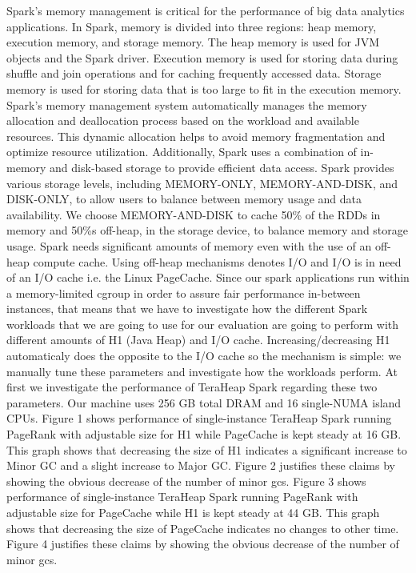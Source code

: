 \documentclass[twocolumn,10pt]{asme2e}
\begin{document}
Spark's memory management is critical for the performance of big data analytics applications. In Spark, memory is divided into three regions: heap memory, execution memory, and storage memory. The heap memory is used for JVM objects and the Spark driver. Execution memory is used for storing data during shuffle and join operations and for caching frequently accessed data. Storage memory is used for storing data that is too large to fit in the execution memory. Spark's memory management system automatically manages the memory allocation and deallocation process based on the workload and available resources. This dynamic allocation helps to avoid memory fragmentation and optimize resource utilization. Additionally, Spark uses a combination of in-memory and disk-based storage to provide efficient data access. Spark provides various storage levels, including MEMORY-ONLY, MEMORY-AND-DISK, and DISK-ONLY, to allow users to balance between memory usage and data availability. We choose MEMORY-AND-DISK to cache 50\% of the RDDs in memory and 50\%s off-heap, in the storage device, to balance memory and storage usage. Spark needs significant amounts of memory even with the use of an off-heap compute cache.
Using off-heap mechanisms denotes I/O and I/O is in need of an I/O cache i.e. the Linux PageCache. Since our spark applications run within a memory-limited cgroup in order to assure fair performance in-between instances, that means that we have to investigate how the different Spark workloads that we are going to use for our evaluation are going to perform with different amounts of H1 (Java Heap) and I/O cache. Increasing/decreasing H1 automaticaly does the opposite to the I/O cache so the mechanism is simple: we manually tune these parameters and investigate how the workloads perform. At first we investigate the performance of TeraHeap Spark regarding these two parameters. Our machine uses 256 GB total DRAM and 16 single-NUMA island CPUs.
\iffalse
Figure 1 shows performance of single-instance TeraHeap Spark running PageRank with adjustable size for H1 while PageCache is kept steady at 16 GB. This graph shows that decreasing the size of H1 indicates a significant increase to Minor GC and a slight increase to Major GC. Figure 2 justifies these claims by showing the obvious decrease of the number of minor gcs. Figure 3 shows performance of single-instance TeraHeap Spark running PageRank with adjustable size for PageCache while H1 is kept steady at 44 GB. This graph shows that decreasing the size of PageCache indicates no changes to other time. Figure 4 justifies these claims by showing the obvious decrease of the number of minor gcs.
\end{document}
